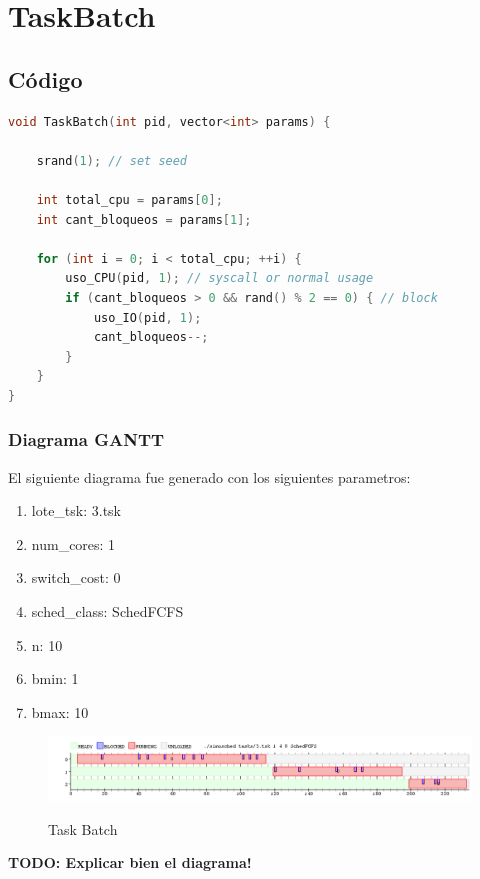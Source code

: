 \section{TaskBatch}

\subsection{Código}

\begin{lstlisting}[language=C++, breaklines=true]
void TaskBatch(int pid, vector<int> params) {

	srand(1); // set seed

	int total_cpu = params[0];
	int cant_bloqueos = params[1];

	for (int i = 0; i < total_cpu; ++i) {
		uso_CPU(pid, 1); // syscall or normal usage
		if (cant_bloqueos > 0 && rand() % 2 == 0) { // block
			uso_IO(pid, 1);
			cant_bloqueos--;
		}
	}
}
\end{lstlisting}

\subsubsection{Diagrama GANTT}

El siguiente diagrama fue generado con los siguientes parametros:

\begin{enumerate}
	\item lote\_tsk: 3.tsk
	\item num\_cores: 1
	\item switch\_cost: 0
	\item sched\_class: SchedFCFS
	\item n: 10
	\item bmin: 1
	\item bmax: 10
\end{enumerate}

\begin{figure}[h]
    \includegraphics[width=\linewidth]{images/3.png}
    \label{fig:Task Consola}
    \caption{Task Batch}
\end{figure}

\textbf{TODO: Explicar bien el diagrama!}